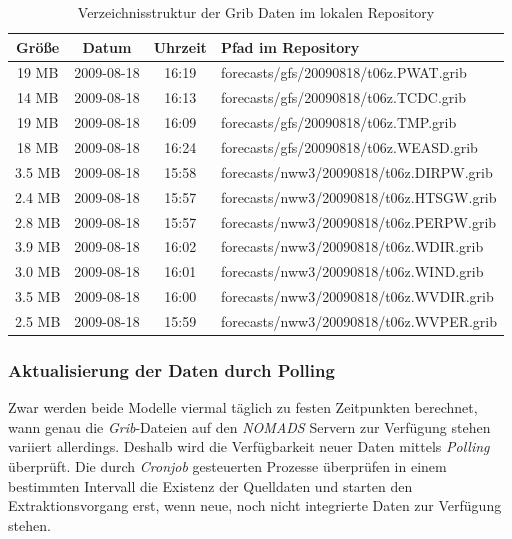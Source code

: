\begin{table}
  \centering
  {\sf
    \footnotesize
    \begin{longtable}{@{}cccl}
      \toprule
      \textbf{Größe} & \textbf{Datum} & \textbf{Uhrzeit} & \textbf{Pfad im Repository} \\
      \midrule
      19 MB & 2009-08-18 & 16:19 & forecasts/gfs/20090818/t06z.PWAT.grib \\
      14 MB & 2009-08-18 & 16:13 & forecasts/gfs/20090818/t06z.TCDC.grib \\
      19 MB & 2009-08-18 & 16:09 & forecasts/gfs/20090818/t06z.TMP.grib \\
      18 MB & 2009-08-18 & 16:24 & forecasts/gfs/20090818/t06z.WEASD.grib \\
      \midrule
      3.5 MB & 2009-08-18 & 15:58 & forecasts/nww3/20090818/t06z.DIRPW.grib \\
      2.4 MB & 2009-08-18 & 15:57 & forecasts/nww3/20090818/t06z.HTSGW.grib \\
      2.8 MB & 2009-08-18 & 15:57 & forecasts/nww3/20090818/t06z.PERPW.grib \\
      3.9 MB & 2009-08-18 & 16:02 & forecasts/nww3/20090818/t06z.WDIR.grib \\
      3.0 MB & 2009-08-18 & 16:01 & forecasts/nww3/20090818/t06z.WIND.grib \\
      3.5 MB & 2009-08-18 & 16:00 & forecasts/nww3/20090818/t06z.WVDIR.grib \\
      2.5 MB & 2009-08-18 & 15:59 & forecasts/nww3/20090818/t06z.WVPER.grib \\
      \bottomrule
    \end{longtable}
  }
  \caption{Verzeichnisstruktur der Grib Daten im lokalen Repository}
  \label{tab:repository}
\end{table}

\subsubsection{Aktualisierung der Daten durch Polling}
Zwar werden beide Modelle viermal täglich zu festen Zeitpunkten
berechnet, wann genau die \textit{Grib}-Dateien auf den
\textit{NOMADS} Servern zur Verfügung stehen variiert
allerdings. Deshalb wird die Verfügbarkeit neuer Daten mittels
\textit{Polling} überprüft. Die durch \textit{Cronjob} gesteuerten
Prozesse überprüfen in einem bestimmten Intervall die Existenz der
Quelldaten und starten den Extraktionsvorgang erst, wenn neue, noch
nicht integrierte Daten zur Verfügung stehen.

